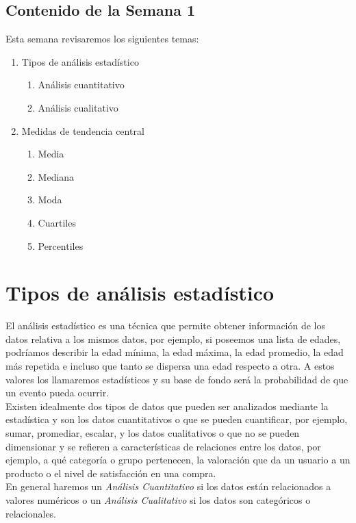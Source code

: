 \documentclass{article}
\begin{document}
\subsection{Contenido de la Semana 1}

Esta semana revisaremos los siguientes temas:

\begin{enumerate}
    \item Tipos de análisis estadístico
    \begin{enumerate}
        \item Análisis cuantitativo
        \item Análisis cualitativo
    \end{enumerate}
    \item Medidas de tendencia central
    \begin{enumerate}
        \item Media
        \item Mediana
        \item Moda
        \item Cuartiles
        \item Percentiles
    \end{enumerate}
\end{enumerate}

\section{Tipos de análisis estadístico}

El análisis estadístico es una técnica que permite obtener información de los datos relativa a los mismos datos, por ejemplo, si poseemos una lista de edades, podríamos describir la edad mínima, la edad máxima, la edad promedio, la edad más repetida e incluso que tanto se dispersa una edad respecto a otra. A estos valores los llamaremos estadísticos y su base de fondo será la probabilidad de que un evento pueda ocurrir.
\\[12pt]
Existen idealmente dos tipos de datos que pueden ser analizados mediante la estadística y son los datos cuantitativos o que se pueden cuantificar, por ejemplo, sumar, promediar, escalar, y los datos cualitativos o que no se pueden dimensionar y se refieren a características de relaciones entre los datos, por ejemplo, a qué categoría o grupo pertenecen, la valoración que da un usuario a un producto o el nivel de satisfacción en una compra.
\\[12pt]
En general haremos un \textit{Análisis Cuantitativo} si los datos están relacionados a valores numéricos o un \textit{Análisis Cualitativo} si los datos son categóricos o relacionales.
\end{document}
